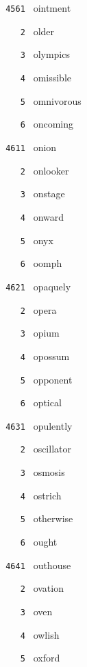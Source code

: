 \documentclass[11pt]{article}
\begin{document}
\begin{multicols}{6}
\vspace{3mm}
\noindent \texttt{ 4561 } ointment  \par
\noindent \texttt{ \ \ \ 2 } older  \par
\noindent \texttt{ \ \ \ 3 } olympics  \par
\noindent \texttt{ \ \ \ 4 } omissible  \par
\noindent \texttt{ \ \ \ 5 } omnivorous  \par
\noindent \texttt{ \ \ \ 6 } oncoming  \par
\noindent \texttt{ 4611 } onion  \par
\noindent \texttt{ \ \ \ 2 } onlooker  \par
\noindent \texttt{ \ \ \ 3 } onstage  \par
\noindent \texttt{ \ \ \ 4 } onward  \par
\noindent \texttt{ \ \ \ 5 } onyx  \par
\noindent \texttt{ \ \ \ 6 } oomph  \par
\vspace{3mm}
\noindent \texttt{ 4621 } opaquely  \par
\noindent \texttt{ \ \ \ 2 } opera  \par
\noindent \texttt{ \ \ \ 3 } opium  \par
\noindent \texttt{ \ \ \ 4 } opossum  \par
\noindent \texttt{ \ \ \ 5 } opponent  \par
\noindent \texttt{ \ \ \ 6 } optical  \par
\vspace{3mm}
\noindent \texttt{ 4631 } opulently  \par
\noindent \texttt{ \ \ \ 2 } oscillator  \par
\noindent \texttt{ \ \ \ 3 } osmosis  \par
\noindent \texttt{ \ \ \ 4 } ostrich  \par
\noindent \texttt{ \ \ \ 5 } otherwise  \par
\noindent \texttt{ \ \ \ 6 } ought  \par
\vspace{3mm}
\noindent \texttt{ 4641 } outhouse  \par
\noindent \texttt{ \ \ \ 2 } ovation  \par
\noindent \texttt{ \ \ \ 3 } oven  \par
\noindent \texttt{ \ \ \ 4 } owlish  \par
\noindent \texttt{ \ \ \ 5 } oxford  \par

\end{multicols}
\end{document}
